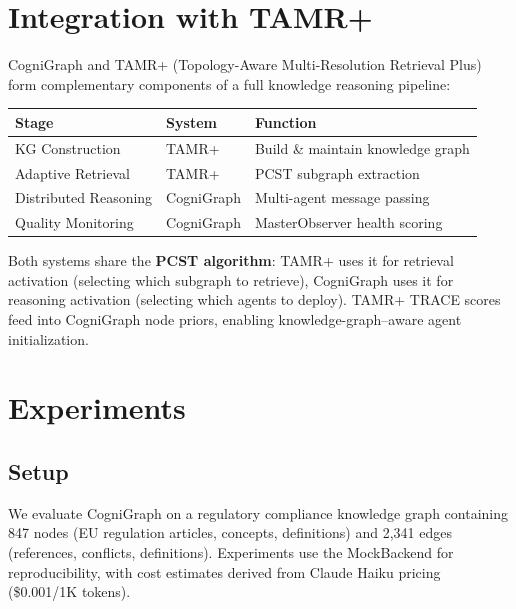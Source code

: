 \documentclass[11pt,a4paper]{article}
\begin{document}
\section{Integration with TAMR+}
\label{sec:tamr}

CogniGraph and TAMR+ (Topology-Aware Multi-Resolution Retrieval Plus) form complementary components of a full knowledge reasoning pipeline:

\begin{center}
\begin{tabular}{lll}
\toprule
\textbf{Stage} & \textbf{System} & \textbf{Function} \\
\midrule
KG Construction & TAMR+ & Build \& maintain knowledge graph \\
Adaptive Retrieval & TAMR+ & PCST subgraph extraction \\
Distributed Reasoning & CogniGraph & Multi-agent message passing \\
Quality Monitoring & CogniGraph & MasterObserver health scoring \\
\bottomrule
\end{tabular}
\end{center}

Both systems share the \textbf{PCST algorithm}: TAMR+ uses it for retrieval activation (selecting which subgraph to retrieve), CogniGraph uses it for reasoning activation (selecting which agents to deploy). TAMR+ TRACE scores feed into CogniGraph node priors, enabling knowledge-graph--aware agent initialization.

\section{Experiments}
\label{sec:experiments}

\subsection{Setup}
We evaluate CogniGraph on a regulatory compliance knowledge graph containing 847 nodes (EU regulation articles, concepts, definitions) and 2,341 edges (references, conflicts, definitions). Experiments use the MockBackend for reproducibility, with cost estimates derived from Claude Haiku pricing (\$0.001/1K tokens).
\end{document}
